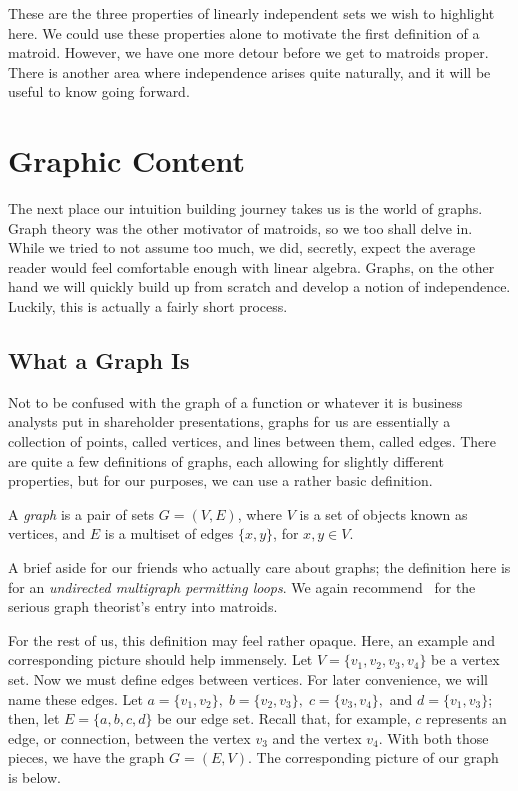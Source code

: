 \documentclass[12pt,oneside]{../../sfsuthesis}
\begin{document}
These are the three properties of linearly independent sets we wish to highlight here.
We could use these properties alone to motivate the first definition of a matroid.
However, we have one more detour before we get to matroids proper.
There is another area where independence arises quite naturally, and it will be useful to know going forward.

\section{Graphic Content}

The next place our intuition building journey takes us is the world of graphs.
Graph theory was the other motivator of matroids, so we too shall delve in.
While we tried to not assume too much, we did, secretly, expect the average reader would feel comfortable enough with linear algebra.
Graphs, on the other hand we will quickly build up from scratch and develop a notion of independence.
Luckily, this is actually a fairly short process.

\subsection{What a Graph Is}
Not to be confused with the graph of a function or whatever it is business analysts put in shareholder presentations, graphs for us are essentially a collection of points, called vertices, and lines between them, called edges.
There are quite a few definitions of graphs, each allowing for slightly different properties, but for our purposes, we can use a rather basic definition.
\begin{definition}[Graph]\label{def:graph}

    A \emph{graph} is a pair of sets \( G = (V, E) \), where \( V \) is a set of objects known as vertices, and \( E \) is a multiset of edges \( \{ x, y \} \), for \( x,y \in V \).
\end{definition}
A brief aside for our friends who actually care about graphs;
the definition here is for an \emph{undirected multigraph permitting loops}.
We again recommend~\cite{oxleyMatroidTheory2011} for the serious graph theorist's entry into matroids.

For the rest of us, this definition may feel rather opaque.
Here, an example and corresponding picture should help immensely.
Let \( V = \{ v_1, v_2, v_3, v_4 \} \) be a vertex set.
Now we must define edges between vertices.
For later convenience, we will name these edges.
Let \( a = \{ v_1, v_2 \}, \; b = \{v_2,v_3\},\; c = \{ v_3, v_4 \},\) and \( d = \{ v_1, v_3 \} \);
then, let \( E = \{ a, b, c, d \} \) be our edge set.
Recall that, for example,  \( c \) represents an edge, or connection, between the vertex \( v_3 \) and the vertex \( v_4 \).
With both those pieces, we have the graph \( G = (E, V) \).
The corresponding picture of our graph is below.
\end{document}
